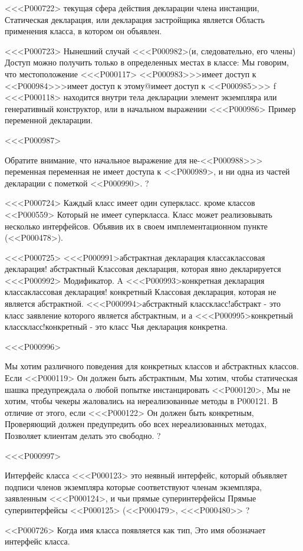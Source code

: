 {{{{{{{{{{<<<P000722>%
текущая сфера действия декларации члена инстанции,
Статическая декларация,
или декларация застройщика является
Область применения класса, в котором он объявлен.

<<<P000723>%
Нынешний случай
<<<P000982>{(и, следовательно, его члены)}
Доступ можно получить только в определенных местах в классе:
Мы говорим, что местоположение <<<P000117>
<<P000983>>>{имеет доступ к <<P000984>>>}{имеет доступ к этому@имеет доступ к <<P000985>>>}
f <<<P000118> находится внутри тела декларации
элемент экземпляра или генеративный конструктор,
или в начальном выражении <<<P000986> Пример переменной декларации.

<<<P000987>{%
Обратите внимание, что начальное выражение для не-<<P000988>>>{} переменная переменная
не имеет доступа к <<P000989>,
и ни одна из частей декларации с пометкой <<P000990>.%
?

<<<P000724>%
Каждый класс имеет один суперкласс.
кроме классов <<P000559> Который не имеет суперкласса.
Класс может реализовывать несколько интерфейсов.
Объявив их в своем имплементационном пункте (<<P000478>).

<<<P000725>%
<<<P000991>{абстрактная декларация класса}{классовая декларация}! абстрактный
Классовая декларация, которая явно декларируется
<<<P000992>{} Модификатор.
A <<<P000993>{конкретная декларация класса}{классовая декларация}! конкретный
Классовая декларация, которая не является абстрактной.
<<<P000994>{абстрактный класс}{класс!абстракт} - это класс
заявление которого является абстрактным, и
а <<<P000995>{конкретный класс}{класс!конкретный} - это класс
Чья декларация конкретна.

<<<P000996>{%
Мы хотим различного поведения для конкретных классов и абстрактных классов.
Если <<P000119> Он должен быть абстрактным,
Мы хотим, чтобы статическая шашка предупреждала о любой попытке инстанцировать <<P000120>,
Мы не хотим, чтобы чекеры жаловались на нереализованные методы в P000121.
В отличие от этого, если <<<P000122> Он должен быть конкретным,
Проверяющий должен предупредить обо всех нереализованных методах,
Позволяет клиентам делать это свободно.%
?

<<<P000997>{%
Интерфейс класса <<<P000123> это
неявный интерфейс, который объявляет подписи членов экземпляра
которые соответствуют членам экземпляра, заявленным <<<P000124>,
и чьи прямые суперинтерфейсы
Прямые суперинтерфейсы <<P000125>
(<<P000479>, <<<P000480>>%
?

<<P000726>%
Когда имя класса появляется как тип,
Это имя обозначает интерфейс класса.

}}}}}}}}}}}}}
